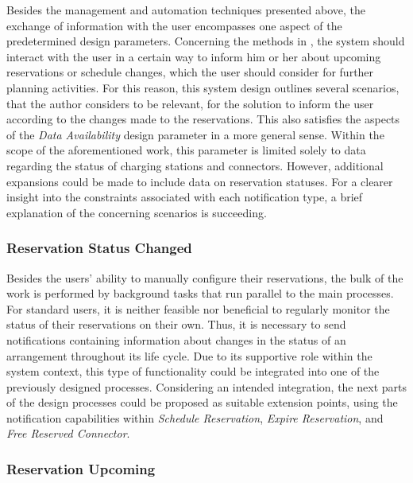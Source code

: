 Besides the management and automation techniques presented above, the exchange of information with the user encompasses one aspect of the predetermined design parameters.
Concerning the methods in \cite{zarkeshev_charging_2018}, the system should interact with the user in a certain way to inform him or her about upcoming reservations or schedule changes, which the user should consider for further planning activities.
For this reason, this system design outlines several scenarios, that the author considers to be relevant, for the solution to inform the user according to the changes made to the reservations.
This also satisfies the aspects of the \textit{Data Availability} design parameter in a more general sense. Within the scope of the aforementioned work, this parameter is limited solely to data regarding the status of charging stations and connectors. However, additional expansions could be made to include data on reservation statuses.
For a clearer insight into the constraints associated with each notification type, a brief explanation of the concerning scenarios is succeeding.

\subsubsection{Reservation Status Changed}
\label{ch:Design:sec:Reservation System:ssec:Notification Capabilities:sssec:Reservation Status Changed}

Besides the users' ability to manually configure their reservations, the bulk of the work is performed by background tasks that run parallel to the main processes.
For standard users, it is neither feasible nor beneficial to regularly monitor the status of their reservations on their own. Thus, it is necessary to send notifications containing information about changes in the status of an arrangement throughout its life cycle.
Due to its supportive role within the system context, this type of functionality could be integrated into one of the previously designed processes.
Considering an intended integration, the next parts of the design processes could be proposed as suitable extension points, using the notification capabilities within \textit{Schedule Reservation}, \textit{Expire Reservation}, and \textit{Free Reserved Connector}.

\subsubsection{Reservation Upcoming}
\label{ch:Design:sec:Reservation System:ssec:Notification Capabilities:sssec:Reservation Upcoming}

